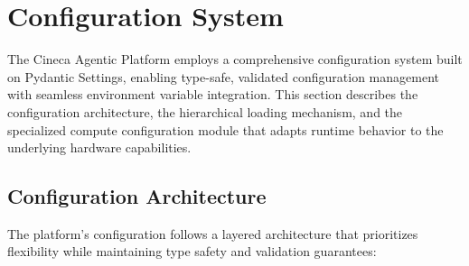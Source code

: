 
\section{Configuration System}
\label{sec:configuration}

The Cineca Agentic Platform employs a comprehensive configuration system built on Pydantic Settings, enabling type-safe, validated configuration management with seamless environment variable integration. This section describes the configuration architecture, the hierarchical loading mechanism, and the specialized compute configuration module that adapts runtime behavior to the underlying hardware capabilities.

\subsection{Configuration Architecture}

The platform's configuration follows a layered architecture that prioritizes flexibility while maintaining type safety and validation guarantees:

